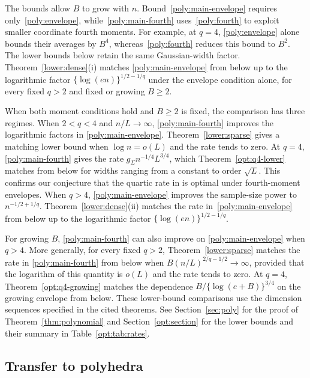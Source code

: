 \documentclass[11pt,letterpaper,twoside,leqno]{article}
\theoremstyle{bookplain}
\theoremstyle{bookremark}
\begin{document}
{
The bounds allow \(B\) to grow with \(n\).
Bound~\eqref{poly:main-envelope} requires only~\eqref{poly:envelope},
while~\eqref{poly:main-fourth} uses~\eqref{poly:fourth} to exploit
smaller coordinate fourth moments. For example, at \(q=4\),
\eqref{poly:envelope} alone bounds their averages by \(B^4\),
whereas~\eqref{poly:fourth} reduces this bound to \(B^2\).
{The lower bounds below retain the same Gaussian-width factor.}
Theorem~\ref{lower:dense}\textup{(i)} matches
\eqref{poly:main-envelope} from below up to the logarithmic factor
\(\{\log(en)\}^{1/2-1/q}\) under the envelope condition alone,
for every fixed \(q>2\) and fixed or growing \(B\ge2\).

When both moment conditions hold and \(B\ge2\) is fixed, the
comparison has three regimes.
When \(2<q<4\) and \(n/L\to\infty\),
\eqref{poly:main-fourth} improves the logarithmic factors in
\eqref{poly:main-envelope}. Theorem~\ref{lower:sparse} gives a
matching lower bound when \(\log n=o(L)\) and the rate tends to zero.
At \(q=4\), \eqref{poly:main-fourth} gives the rate
{\(g_\Sigma n^{-1/4}L^{3/4}\), which
Theorem~\ref{opt:q4-lower} matches from below for widths ranging
from a constant to order \(\sqrt L\).}
This confirms our conjecture that the quartic rate in
\cite[Theorem~2.5]{CCKK2022} is optimal under fourth-moment envelopes.
When \(q>4\), \eqref{poly:main-envelope} improves the sample-size
power to \(n^{-1/2+1/q}\). Theorem~\ref{lower:dense}\textup{(ii)} matches the
rate in~\eqref{poly:main-envelope} from below up to the logarithmic factor
\(\{\log(en)\}^{1/2-1/q}\).

For growing \(B\), \eqref{poly:main-fourth} can also improve on
\eqref{poly:main-envelope} when \(q>4\). More generally, for every
fixed \(q>2\), Theorem~\ref{lower:sparse} matches the rate in
\eqref{poly:main-fourth} from below when \(B(n/L)^{2/q-1/2}\to\infty\),
provided that the logarithm of this quantity is \(o(L)\) and the
rate tends to zero. At \(q=4\), Theorem~\ref{opt:q4-growing}
matches the dependence \(B/\{\log(e+B)\}^{3/4}\) on the growing
envelope from below. These lower-bound comparisons use the dimension sequences
specified in the cited theorems. See Section~\ref{sec:poly} for
the proof of Theorem~\ref{thm:polynomial} and
Section~\ref{opt:section} for the lower bounds and their summary
in Table~\ref{opt:tab:rates}.
}

\subsection{Transfer to polyhedra}\label{sec:polyhedral-transfer}
\end{document}

